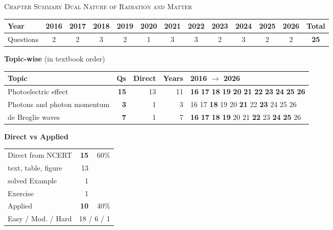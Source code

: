 \par{}\vspace{14pt}
\begin{center}{}\par
{\large\color{navy}\scshape Chapter Summary \textperiodcentered{} Dual Nature of Radiation and Matter}\end{center}
{\small\setlength{\tabcolsep}{3.5pt}
\begin{tabular*}{\linewidth}{@{\extracolsep{\fill}}l*{11}{c}c@{}}\toprule
Year & 2016 & 2017 & 2018 & 2019 & 2020 & 2021 & 2022 & 2023 & 2024 & 2025 & 2026 & Total\\\midrule
Questions & 2 & 2 & 3 & 2 & 1 & 3 & 3 & 2 & 3 & 2 & 2 & \textbf{25}\\\bottomrule\end{tabular*}}\par\medskip
{\small\textbf{\color{crimson}Topic-wise} (in textbook order)\par\smallskip
\begin{tabularx}{\linewidth}{@{}>{\raggedright\arraybackslash}Xrrrl@{}}\toprule
Topic & Qs & Direct & Years & 2016 $\rightarrow$ 2026\\\midrule
Photoelectric effect & \textbf{15} & 13 & 11 & {\scriptsize \textbf{16} \textbf{17} \textbf{18} \textbf{19} \textbf{20} \textbf{21} \textbf{22} \textbf{23} \textbf{24} \textbf{25} \textbf{26}}\\
Photons and photon momentum & \textbf{3} & 1 & 3 & {\scriptsize {\color{gray!45}16} {\color{gray!45}17} \textbf{18} {\color{gray!45}19} {\color{gray!45}20} \textbf{21} {\color{gray!45}22} \textbf{23} {\color{gray!45}24} {\color{gray!45}25} {\color{gray!45}26}}\\
de Broglie waves & \textbf{7} & 1 & 7 & {\scriptsize \textbf{16} \textbf{17} \textbf{18} \textbf{19} {\color{gray!45}20} {\color{gray!45}21} \textbf{22} {\color{gray!45}23} \textbf{24} \textbf{25} {\color{gray!45}26}}\\
\bottomrule\end{tabularx}}\par\medskip
\begin{minipage}[t]{0.34\linewidth}{\small\textbf{\color{crimson}Direct vs Applied}\par\smallskip
\begin{tabular}{@{}lrr@{}}\toprule
Direct from NCERT & \textbf{15} & 60\%\\
\quad text, table, figure & 13 &\\
\quad solved Example & 1 &\\
\quad Exercise & 1 &\\
Applied & \textbf{10} & 40\%\\\midrule
Easy / Mod. / Hard & \multicolumn{2}{r}{18 / 6 / 1}\\\bottomrule
\end{tabular}}\end{minipage}\hfill
